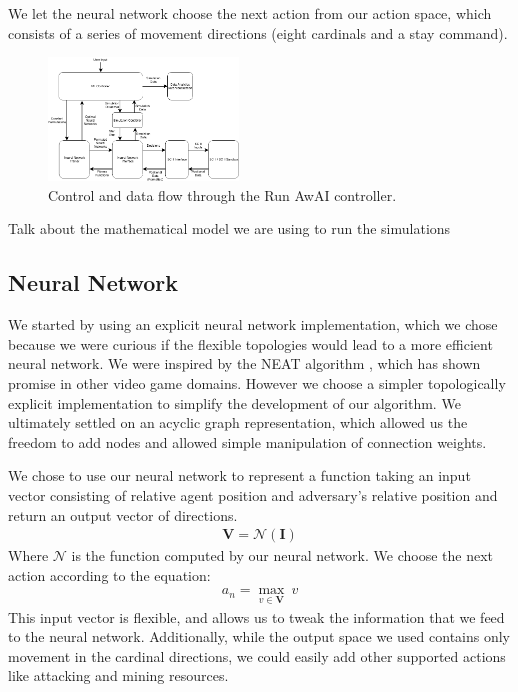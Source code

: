 \documentclass{article}
\begin{document}
\begin{multicols}{2}
We let the neural network choose the next action from our action space, which
consists of a series of movement directions (eight cardinals and a stay
command).

\begin{figure}[H]
\centering
\includegraphics[width=0.45\textwidth]{chart}
\begin{changemargin}{0.15in}{0.15in}
  \caption{Control and data flow through the Run AwAI controller.}
\end{changemargin}
\end{figure}

Talk about the mathematical model we are using to run the simulations

\subsection{Neural Network}
We started by using an explicit neural network implementation, which we chose
because we were curious if the flexible topologies would lead to a more
efficient neural network. We were inspired by the NEAT algorithm \cite{NEAT}, which has
shown promise in other video game domains. However we choose a simpler
topologically explicit implementation to simplify the development of our
algorithm. We ultimately settled on an acyclic graph representation, which
allowed us the freedom to add nodes and allowed simple manipulation of
connection weights.

We chose to use our neural network to represent a function taking an input
vector consisting of relative agent position and adversary's relative position
and return an output vector of directions.
\begin{align}
  \bm{V} = \mathcal{N}(\bm{I})
\end{align}
Where $\mathcal{N}$ is the function computed by our neural network. We choose
the next action according to the equation:
\begin{align}
  a_n = \max_{v \in \bm{V}} \: v
\end{align}
This input vector is flexible, and allows us to tweak the information that we
feed to the neural network. Additionally, while the output space we used
contains only movement in the cardinal directions, we could easily add other
supported actions like attacking and mining resources.


\end{multicols}
\end{document}

